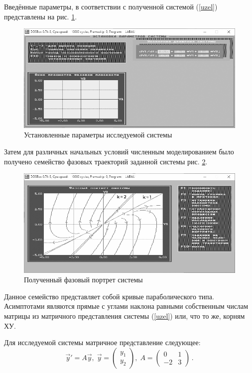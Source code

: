 	Введённые параметры, в соответствии с полученной системой (\ref{uzel}) представлены на рис. \ref{params2}.
	
	\begin{figure}[h]
		\centering\includegraphics[width=.7\textwidth,trim={300px 190px 20px 33px},clip]{Узел/Параметры.png}
		\caption{Установленные параметры исследуемой системы}
		\label{params2}
	\end{figure}
	
	Затем для различных начальных условий численным моделированием было получено семейство фазовых траекторий заданной системы рис. \ref{portret2}.
	
	\begin{figure}[h]
		\centering\includegraphics[width=.6\textwidth,trim={0 0 165px 20px},clip]{Узел/Портрет.png}
		\caption{Полученный фазовый портрет системы}
		\label{portret2}
	\end{figure}
	
	Данное семейство представляет собой кривые параболического типа. Асимптотами являются прямые с углами наклона равными собственным числам матрицы из матричного представления системы (\ref{uzel}) или, что то же, корням ХУ. 
	
	Для исследуемой системы матричное представление следующее:
	\begin{equation*}
		\vec{y}' = A\vec{y},\; \vec{y} = \begin{pmatrix}y_1 \\ y_2\end{pmatrix},\; A=\begin{pmatrix}0 & 1 \\ -2 & 3\end{pmatrix}\,.
	\end{equation*}
	
